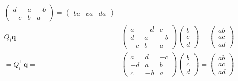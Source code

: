 \documentclass[
]{book}
\theoremstyle{definition}
\theoremstyle{definition}
\theoremstyle{definition}
\theoremstyle{definition}
\theoremstyle{remark}
\begin{document}
\[\begin{aligned}
\begin{pmatrix}
d & a & -b\\
-c & b & a
\end{pmatrix}=\begin{pmatrix}ba & ca & da\end{pmatrix}\\
Q_{{\scriptscriptstyle i}}\boldsymbol{q}= & \begin{pmatrix}a & -d & c\\
d & a & -b\\
-c & b & a
\end{pmatrix}\begin{pmatrix}b\\
c\\
d
\end{pmatrix}=\begin{pmatrix}ab\\
ac\\
ad
\end{pmatrix}\\
=Q_{{\scriptscriptstyle i}}^{\intercal}\boldsymbol{q}= & \begin{pmatrix}a & d & -c\\
-d & a & b\\
c & -b & a
\end{pmatrix}\begin{pmatrix}b\\
c\\
d
\end{pmatrix}=\begin{pmatrix}ab\\
ac\\
ad
\end{pmatrix}
\end{aligned}
\]
\end{document}
